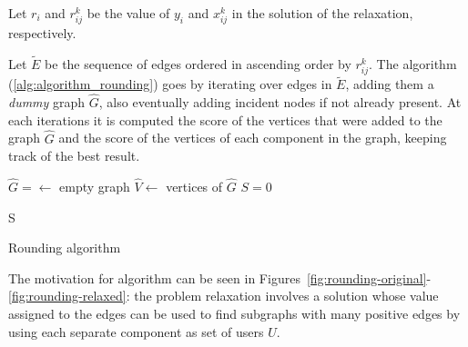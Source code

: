 Let $r_{i}$ and $r_{ij} ^{k} $ be the value of $y_i$ and $x_{ij}^{k} $ in the
solution of the relaxation, respectively.

Let $\tilde{E}$ be the sequence of edges ordered in ascending order by $r_{ij}
		^{k} $. The algorithm (\autoref{alg:algorithm_rounding}) goes by iterating over
edges in $\tilde{E}$, adding them a \emph{dummy} graph $\hat{G}$, also eventually
adding incident nodes if not already present. At each iterations it is computed
the score of the vertices that were added to the graph $\hat{G}$ and the score
of the vertices of each component in the graph, keeping track of the best
result.

\begin{algorithm}
	\SetAlgoLined
	$\hat{G} = \leftarrow $ empty graph \;
	$\hat{V} \leftarrow $ vertices of $\hat{G}$ \;
	$S = 0$


	\Return S \;
	\caption{Rounding algorithm}
	\label{alg:algorithm_rounding}
\end{algorithm}

The motivation for algorithm can be seen in
Figures~\ref{fig:rounding-original}-\ref{fig:rounding-relaxed}: the problem
relaxation involves a solution whose value assigned to the edges can be used to
find subgraphs with many positive edges by using each separate component as set
of users $U$.

